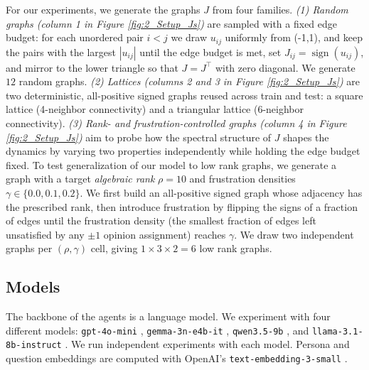 For our experiments, we generate the graphs $J$ from four families. \textit{(1) Random graphs (column 1 in Figure \ref{fig:2_Setup_Js})} are sampled with a fixed edge budget: for each unordered pair $i<j$ we draw $u_{ij}$ uniformly from (-1,1), and keep the pairs with the largest $|u_{ij}|$ until the edge budget is met, set $J_{ij}=\operatorname{sign}(u_{ij})$, and mirror to the lower triangle so that $J=J^{\top}$ with zero diagonal. We generate $12$ random graphs. \textit{(2) Lattices (columns 2 and 3 in Figure \ref{fig:2_Setup_Js})} are two deterministic, all-positive signed graphs reused across train and test: a square lattice (4-neighbor connectivity) and a triangular lattice (6-neighbor connectivity). \textit{(3) Rank- and frustration-controlled graphs (column 4 in Figure \ref{fig:2_Setup_Js})} aim to probe how the spectral structure of $J$ shapes the dynamics by varying two properties independently while holding the edge budget fixed. To test generalization of our model to low rank graphs, we generate a graph with a target \emph{algebraic rank} $\rho = 10$ and frustration densities $\gamma\in\{0.0,0.1,0.2\}$. We first build an all-positive signed graph whose adjacency has the prescribed rank, then introduce frustration by flipping the
signs of a fraction of edges until the frustration
density (the smallest fraction of edges left unsatisfied by any $\pm1$ opinion assignment) reaches $\gamma$. We draw two independent graphs per $(\rho,\gamma)$ cell, giving $1\times 3\times 2 = 6$ low rank graphs.

\subsection{Models}\label{apdx:models}

The backbone of the agents is a language model. We experiment with four different models: \texttt{gpt-4o-mini} \citep{openai2024gpt4ocard},
\texttt{gemma-3n-e4b-it} \citep{gemmateam2025gemma3technicalreport}, \texttt{qwen3.5-9b} \citep{qwen3.5},
and \texttt{llama-3.1-8b-instruct} \citep{grattafiori2024llama3herdmodels}. We run independent experiments with each model. Persona and question embeddings are computed
with OpenAI's \texttt{text-embedding-3-small} \citep{neelakantan2022textcodeembeddingscontrastive}.

